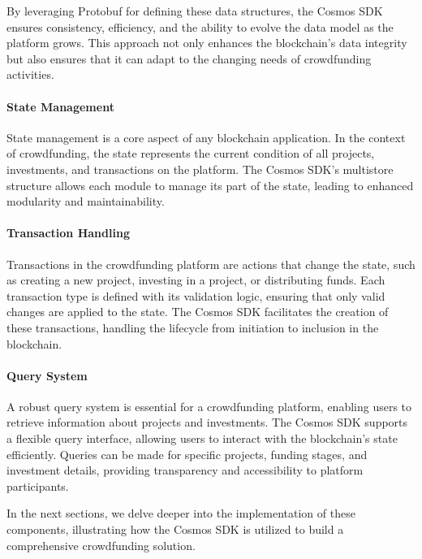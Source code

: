 By leveraging Protobuf for defining these data structures, the Cosmos SDK ensures consistency, efficiency, and the ability to evolve the data model as the platform grows. This approach not only enhances the blockchain's data integrity but also ensures that it can adapt to the changing needs of crowdfunding activities.

\paragraph{State Management}
\label{par:state-management}

State management is a core aspect of any blockchain application. In the context of crowdfunding, the state represents the current condition of all projects, investments, and transactions on the platform. The Cosmos SDK's multistore structure allows each module to manage its part of the state, leading to enhanced modularity and maintainability.

\paragraph{Transaction Handling}
\label{par:transaction-handling}

Transactions in the crowdfunding platform are actions that change the state, such as creating a new project, investing in a project, or distributing funds. Each transaction type is defined with its validation logic, ensuring that only valid changes are applied to the state. The Cosmos SDK facilitates the creation of these transactions, handling the lifecycle from initiation to inclusion in the blockchain.

\paragraph{Query System}
\label{par:query-system}

A robust query system is essential for a crowdfunding platform, enabling users to retrieve information about projects and investments. The Cosmos SDK supports a flexible query interface, allowing users to interact with the blockchain's state efficiently. Queries can be made for specific projects, funding stages, and investment details, providing transparency and accessibility to platform participants.

In the next sections, we delve deeper into the implementation of these components, illustrating how the Cosmos SDK is utilized to build a comprehensive crowdfunding solution.

